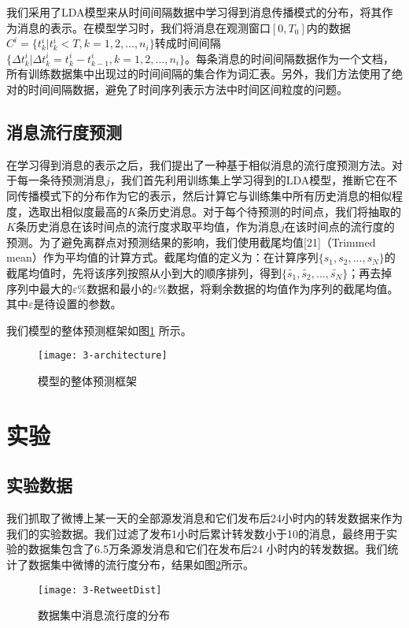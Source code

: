 我们采用了LDA模型来从时间间隔数据中学习得到消息传播模式的分布，将其作为消息的表示。在模型学习时，我们将消息在观测窗口$[0,T_0]$内的数据$C^i=\{t_k^i|t_k^i<T,k=1,2,...,n_i\}$转成时间间隔 $\{\Delta t_k^i|\Delta t_k^i=t_k^i-t_{k-1}^i,k=1,2,...,n_i\}$。每条消息的时间间隔数据作为一个文档，所有训练数据集中出现过的时间间隔的集合作为词汇表。另外，我们方法使用了绝对的时间间隔数据，避免了时间序列表示方法中时间区间粒度的问题。

\subsection{消息流行度预测}
在学习得到消息的表示之后，我们提出了一种基于相似消息的流行度预测方法。对于每一条待预测消息$j$，我们首先利用训练集上学习得到的LDA模型，推断它在不同传播模式下的分布作为它的表示，然后计算它与训练集中所有历史消息的相似程度，选取出相似度最高的$K$条历史消息。对于每个待预测的时间点，我们将抽取的$K$条历史消息在该时间点的流行度求取平均值，作为消息$j$在该时间点的流行度的预测。为了避免离群点对预测结果的影响，我们使用截尾均值[21]（Trimmed mean）作为平均值的计算方式。截尾均值的定义为：在计算序列$\{s_1,s_2,...,s_N\}$的截尾均值时，先将该序列按照从小到大的顺序排列，得到$\{\widetilde{s_1},\widetilde{s_2},...,\widetilde{s_N}\}$；再去掉序列中最大的$\varepsilon$\%数据和最小的$\varepsilon$\%数据，将剩余数据的均值作为序列的截尾均值。其中$\varepsilon$是待设置的参数。

我们模型的整体预测框架如图\ref{fig:architecture} 所示。
\begin{figure}[!htbp]
  \centering
  \texttt{[image: 3-architecture]}
  \caption{模型的整体预测框架}
  \label{fig:architecture}
\end{figure}

\section{实验}
\subsection{实验数据}
我们抓取了微博上某一天的全部源发消息和它们发布后24小时内的转发数据来作为我们的实验数据。我们过滤了发布1小时后累计转发数小于10的消息，最终用于实验的数据集包含了6.5万条源发消息和它们在发布后24 小时内的转发数据。我们统计了数据集中微博的流行度分布，结果如图\ref{fig:retweetDist}所示。
\begin{figure}[!htbp]
  \centering
  \texttt{[image: 3-RetweetDist]}
  \caption{数据集中消息流行度的分布}
  \label{fig:retweetDist}
\end{figure}

